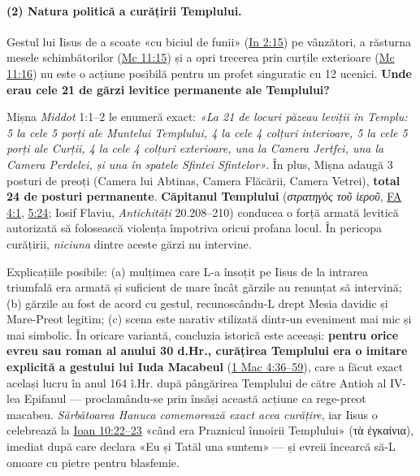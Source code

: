 \documentclass[12pt,a4paper,twoside,openany]{book}
\begin{document}
\paragraph*{(2) Natura politică a curățirii Templului.} Gestul lui Iisus de a scoate «cu biciul de funii» (\href{https://bibliaortodoxa.ro/carte.php?id=35\&cap=2\#15}{In 2:15}) pe vânzători, a răsturna mesele schimbătorilor (\href{https://bibliaortodoxa.ro/carte.php?id=53\&cap=11\#15}{Mc 11:15}) și a opri trecerea prin curțile exterioare (\href{https://bibliaortodoxa.ro/carte.php?id=53\&cap=11\#16}{Mc 11:16}) nu este o acțiune posibilă pentru un profet singuratic cu 12 ucenici. \textbf{Unde erau cele 21 de gărzi levitice permanente ale Templului?}

Mișna \textit{Middot} 1:1--2 le enumeră exact: \textit{«La 21 de locuri păzeau leviții în Templu: 5 la cele 5 porți ale Muntelui Templului, 4 la cele 4 colțuri interioare, 5 la cele 5 porți ale Curții, 4 la cele 4 colțuri exterioare, una la Camera Jertfei, una la Camera Perdelei, și una în spatele Sfintei Sfintelor»}. În plus, Mișna adaugă 3 posturi de preoți (Camera lui Abtinas, Camera Flăcării, Camera Vetrei), \textbf{total 24 de posturi permanente}. \textbf{Căpitanul Templului} (\textit{στρατηγὸς τοῦ ἱεροῦ}, \href{https://bibliaortodoxa.ro/carte.php?id=51\&cap=4\#1}{FA 4:1}, \href{https://bibliaortodoxa.ro/carte.php?id=51\&cap=5\#24}{5:24}; Iosif Flaviu, \textit{Antichități} 20.208--210) conducea o forță armată levitică autorizată să folosească violența împotriva oricui profana locul. În pericopa curățirii, \textit{niciuna} dintre aceste gărzi nu intervine.

Explicațiile posibile: (a) mulțimea care L-a însoțit pe Iisus de la intrarea triumfală era armată și suficient de mare încât gărzile au renunțat să intervină; (b) gărzile au fost de acord cu gestul, recunoscându-L drept Mesia davidic și Mare-Preot legitim; (c) scena este narativ stilizată dintr-un eveniment mai mic și mai simbolic. În oricare variantă, concluzia istorică este aceeași: \textbf{pentru orice evreu sau roman al anului 30 d.Hr., curățirea Templului era o imitare explicită a gestului lui Iuda Macabeul} (\href{https://bibliaortodoxa.ro/carte.php?id=20\&cap=4\#36}{1 Mac 4:36--59}), care a făcut exact același lucru în anul 164 î.Hr. după pângărirea Templului de către Antioh al IV-lea Epifanul --- proclamându-se prin însăși această acțiune ca rege-preot macabeu. \textit{Sărbătoarea Hanuca comemorează exact acea curățire}, iar Iisus o celebrează la \href{https://bibliaortodoxa.ro/carte.php?id=35\&cap=10\#22}{Ioan 10:22--23} «când era Praznicul înnoirii Templului» (τὰ ἐγκαίνια), imediat după care declara «Eu și Tatăl una suntem» --- și evreii încearcă să-L omoare cu pietre pentru blasfemie.
\end{document}
